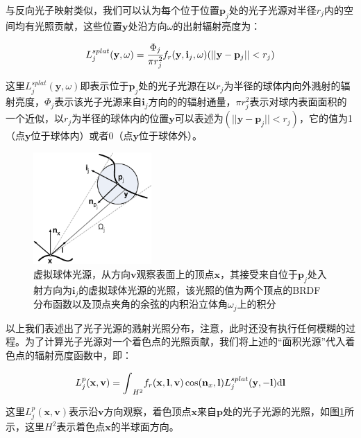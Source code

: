 与反向光子映射类似，我们可以认为每个位于位置$\mathbf{p}_j$处的光子光源对半径$r_j$内的空间均有光照贡献，这些位置$\mathbf{y}$处沿方向$\omega$的出射辐射亮度为：

\begin{equation}\label{e:ir-vpl-splatting}
	L^{splat}_j(\mathbf{y},\omega)= \cfrac{\Phi_j}{\pi r^{2}_j}f_r(\mathbf{y},\mathbf{i}_j,\omega)(||\mathbf{y}-\mathbf{p}_j||<r_j)
\end{equation}

\noindent 这里$L^{splat}_j(\mathbf{y},\omega)$即表示位于$\mathbf{p}_j$处的光子光源在以$r_j$为半径的球体内向外溅射的辐射亮度，$\Phi_j$表示该光子光源来自$\mathbf{i}_j$方向的的辐射通量，$\pi r^{2}_j$表示对球内表面面积的一个近似，以$r_j$为半径的球体内的位置$\mathbf{y}$可以表述为$(||\mathbf{y}-\mathbf{p}_j||<r_j)$，它的值为1（点$\mathbf{y}$位于球体内）或者0（点$\mathbf{y}$位于球体外）。

\begin{figure}
	\sidecaption
	\includegraphics[width=0.4\textwidth]{figures/ir/vsl}
	\caption{虚拟球体光源，从方向$\mathbf{v}$观察表面上的顶点$\mathbf{x}$，其接受来自位于$\mathbf{p}_j$处入射方向为$\mathbf{i}_j$的虚拟球体光源的光照，该光照的值为两个顶点的BRDF分布函数以及顶点夹角的余弦的内积沿立体角$\omega_j$上的积分}
	\label{f:ir-vsl}
\end{figure}

以上我们表述出了光子光源的溅射光照分布，注意，此时还没有执行任何模糊的过程。为了计算光子光源对一个着色点的光照贡献，我们将上述的“面积光源”代入着色点的辐射亮度函数中，即：

\begin{equation}\label{e:ir-shading-point-radiance}
	L^{p}_j(\mathbf{x},\mathbf{v})={\rm \int}_{H^{2}}f_r(\mathbf{x},\mathbf{l},\mathbf{v})\cos(\mathbf{n}_x,\mathbf{l})L^{splat}_j(\mathbf{y},-\mathbf{l}){\rm d}\mathbf{l}
\end{equation}

\noindent 这里$L^{p}_j(\mathbf{x},\mathbf{v})$表示沿$\mathbf{v}$方向观察，着色顶点$\mathbf{x}$来自$\mathbf{p}$处的光子光源的光照，如图\ref{f:ir-vsl}所示，这里$H^{2}$表示着色点$\mathbf{x}$的半球面方向。

